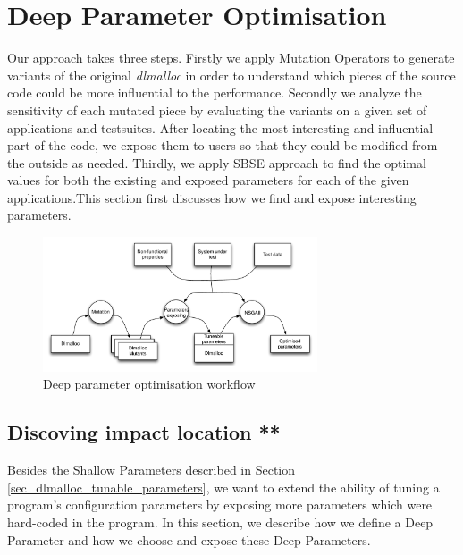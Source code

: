 \section{Deep Parameter Optimisation}

Our approach takes three steps. Firstly we apply Mutation Operators to generate variants of the original \emph{dlmalloc} in order to understand which pieces of the source code could be more influential to the performance. Secondly we analyze the sensitivity of each mutated piece by evaluating the variants on a given set of applications and testsuites. After locating the most interesting and influential part of the code, we expose them to users so that they could be modified from the outside as needed. Thirdly, we apply SBSE approach to find the optimal values for both the existing and exposed parameters for each of the given applications.This section first discusses how we find and expose interesting parameters.


\begin{figure}[htbp]
\centering
\includegraphics[width=3.2in]{pics/system}
\caption{Deep parameter optimisation workflow}\label{system}
\end{figure}

\subsection{Discoving impact location **}

Besides the Shallow Parameters described in Section \ref{sec_dlmalloc_tunable_parameters}, we want to extend the ability of tuning a program's configuration parameters by exposing more parameters which were hard-coded in the program. In this section, we describe how we define a Deep Parameter and how we choose and expose these Deep Parameters.

